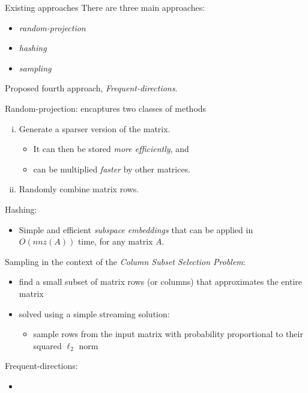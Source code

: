 \documentclass[first=dgreen,second=purple,logo=redque]{aaltoslides}
\begin{document}
\begin{frame}[allowframebreaks=1]{Existing approaches}
There are three main approaches:
\begin{itemize}
	\item \textit{random-projection}
	\item \textit{hashing}
	\item \textit{sampling}
\end{itemize}

Proposed fourth approach, \textit{Frequent-directions}.

\framebreak

Random-projection: encaptures two classes of methods
\begin{enumerate}[(i)]
  \item Generate a sparser version of the matrix.
  	\begin{itemize}
  	  \item It can then be stored \textit{more efficiently}, and
  	  \item can be multiplied \textit{faster} by other matrices.
    \end{itemize}
  \item Randomly combine matrix rows.
\end{enumerate} 

\framebreak

Hashing:
\begin{itemize}
  \item Simple and efficient \textit{subspace embeddings}
     that can be applied in $O(nnz(A))$ time, for any matrix $A$.
\end{itemize}

\framebreak

Sampling in the context of the \textit{Column Subset Selection Problem}:
\begin{itemize}
  \item find a small subset of matrix rows (or columns) that approximates
  the entire matrix
  \item solved using a simple streaming solution:
  	\begin{itemize}
  	  \item sample rows from the input matrix with probability proportional to
  	  their squared $\ell_{2}$ norm
  	\end{itemize}
\end{itemize}

\framebreak

Frequent-directions:
\begin{itemize}
  \item 
\end{itemize}

\end{frame}

\end{document}
